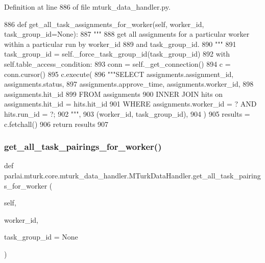 Definition at line 886 of file mturk\+\_\+data\+\_\+handler.\+py.


\begin{DoxyCode}
886     \textcolor{keyword}{def }get\_all\_task\_assignments\_for\_worker(self, worker\_id, task\_group\_id=None):
887         \textcolor{stringliteral}{"""}
888 \textcolor{stringliteral}{        get all assignments for a particular worker within a particular run by worker\_id}
889 \textcolor{stringliteral}{        and task\_group\_id.}
890 \textcolor{stringliteral}{        """}
891         task\_group\_id = self.\_force\_task\_group\_id(task\_group\_id)
892         with self.table\_access\_condition:
893             conn = self.\_get\_connection()
894             c = conn.cursor()
895             c.execute(
896                 \textcolor{stringliteral}{"""SELECT assignments.assignment\_id, assignments.status,}
897 \textcolor{stringliteral}{                         assignments.approve\_time, assignments.worker\_id,}
898 \textcolor{stringliteral}{                         assignments.hit\_id}
899 \textcolor{stringliteral}{                         FROM assignments}
900 \textcolor{stringliteral}{                         INNER JOIN hits on assignments.hit\_id = hits.hit\_id}
901 \textcolor{stringliteral}{                         WHERE assignments.worker\_id = ? AND hits.run\_id = ?;}
902 \textcolor{stringliteral}{                         """},
903                 (worker\_id, task\_group\_id),
904             )
905             results = c.fetchall()
906             \textcolor{keywordflow}{return} results
907 
\end{DoxyCode}
\mbox{\label{classparlai_1_1mturk_1_1core_1_1mturk__data__handler_1_1MTurkDataHandler_a6077d39b847f52f65dc7cedc709ea25c}} 
\subsubsection{\texorpdfstring{get\+\_\+all\+\_\+task\+\_\+pairings\+\_\+for\+\_\+worker()}{get\_all\_task\_pairings\_for\_worker()}}
{\footnotesize\ttfamily def parlai.\+mturk.\+core.\+mturk\+\_\+data\+\_\+handler.\+M\+Turk\+Data\+Handler.\+get\+\_\+all\+\_\+task\+\_\+pairings\+\_\+for\+\_\+worker (\begin{DoxyParamCaption}\item[{}]{self,  }\item[{}]{worker\+\_\+id,  }\item[{}]{task\+\_\+group\+\_\+id = {\ttfamily None} }\end{DoxyParamCaption})}

